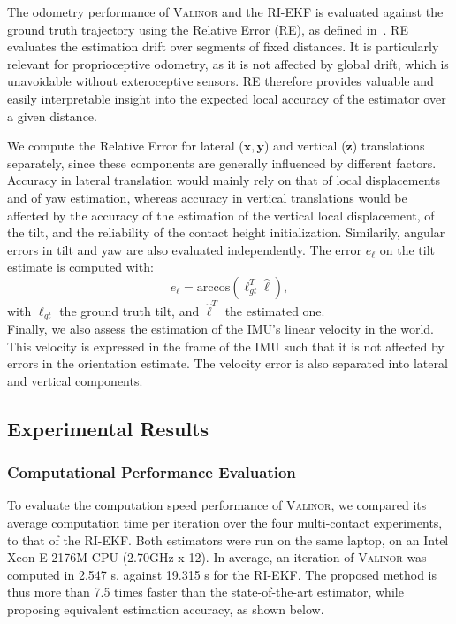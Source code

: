\documentclass{IJCAS}
\begin{document}
The odometry performance of {\scshape Valinor} and the RI-EKF is evaluated against the ground truth trajectory using the Relative Error (RE), as defined in~\cite{Zhang2018QuantitativeTrajectoryEvaluation}. RE evaluates the estimation drift over segments of fixed distances. It is particularly relevant for proprioceptive odometry, as it is not affected by global drift, which is unavoidable without exteroceptive sensors. RE therefore provides valuable and easily interpretable insight into the expected local accuracy of the estimator over a given distance.

We compute the Relative Error for lateral ($\boldsymbol{x}, \boldsymbol{y}$) and vertical ($\boldsymbol{z}$) translations separately, since these components are generally influenced by different factors. Accuracy in lateral translation would mainly rely on that of local displacements and of yaw estimation, whereas accuracy in vertical translations would be affected by the accuracy of the estimation of the vertical local displacement, of the tilt, and the reliability of the contact height initialization. Similarily, angular errors in tilt and yaw are also evaluated independently.
The error $e_{\boldsymbol{\ell}}$ on the tilt estimate is computed with:
\begin{equation}
    e_{\boldsymbol{\ell}} = \text{arccos}\left(\boldsymbol{\ell}_{gt}^{T} \hat{\boldsymbol{\ell}} \right),
\end{equation}
with $\boldsymbol{\ell}_{gt}$ the ground truth tilt, and $\hat{\boldsymbol{\ell}}^{T}$ the estimated one.\\
Finally, we also assess the estimation of the IMU's linear velocity in the world. This velocity is expressed in the frame of the IMU such that it is not affected by errors in the orientation estimate. The velocity error is also separated into lateral and vertical components.

\subsection{Experimental Results}

\subsubsection{Computational Performance Evaluation}\label{subsec:computation_time}

To evaluate the computation speed performance of {\scshape Valinor}, we compared its average computation time per iteration over the four multi-contact experiments, to that of the RI-EKF. Both estimators were run on the same laptop, on an Intel Xeon E-2176M CPU (2.70GHz x 12). In average, an iteration of {\scshape Valinor} was computed in 2.547 \textmu s, against 19.315 \textmu s for the RI-EKF. The proposed method is thus more than 7.5 times faster than the state-of-the-art estimator, while proposing equivalent estimation accuracy, as shown below.
\end{document}
